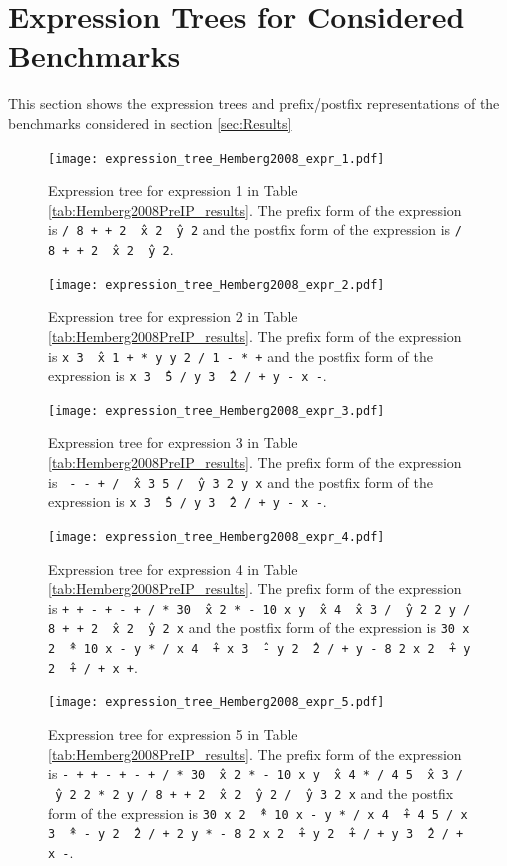 \documentclass[12pt]{iopart}
\begin{document}
\section{Expression Trees for Considered Benchmarks} %
This section shows the expression trees and prefix/postfix representations of the benchmarks considered in section \ref{sec:Results}

\begin{figure}
    \centering
    \texttt{[image: expression\_tree\_Hemberg2008\_expr\_1.pdf]}
    \caption{Expression tree for expression 1 in Table \ref{tab:Hemberg2008PreIP_results}. The prefix form of the expression is \texttt{/ 8 + + 2 \^\ x 2 \^\ y 2} and the postfix form of the expression is \texttt{/ 8 + + 2 \^\ x 2 \^\ y 2}. }
    \label{fig:expression_tree_Hemberg2008_expr_1}
\end{figure}

\begin{figure}
    \centering
    \texttt{[image: expression\_tree\_Hemberg2008\_expr\_2.pdf]}
    \caption{Expression tree for expression 2 in Table \ref{tab:Hemberg2008PreIP_results}. The prefix form of the expression is \texttt{x 3 \^\ x 1 + * y y 2 / 1 - * +} and the postfix form of the expression is \texttt{x 3 \^\ 5 / y 3 \^\ 2 / + y - x -}. } 
    \label{fig:expression_tree_Hemberg2008_expr_2}
\end{figure}

\begin{figure}
    \centering
    \texttt{[image: expression\_tree\_Hemberg2008\_expr\_3.pdf]}
    \caption{Expression tree for expression 3 in Table \ref{tab:Hemberg2008PreIP_results}. The prefix form of the expression is \texttt{ - - + / \^\ x 3 5 / \^\ y 3 2 y x} and the postfix form of the expression is \texttt{x 3 \^\ 5 / y 3 \^\ 2 / + y - x -}. } 
    \label{fig:expression_tree_Hemberg2008_expr_3}
\end{figure}

\begin{figure}
    \centering
    \texttt{[image: expression\_tree\_Hemberg2008\_expr\_4.pdf]}
    \caption{Expression tree for expression 4 in Table \ref{tab:Hemberg2008PreIP_results}.  The prefix form of the expression is \texttt{+ + - + - + / * 30 \^\ x 2 * - 10 x y \^\ x 4 \^\ x 3 / \^\ y 2 2 y / 8 + + 2 \^\ x 2 \^\ y 2 x} and the postfix form of the expression is \texttt{30 x 2 \^\ * 10 x - y * / x 4 \^\ + x 3 \^\ - y 2 \^\ 2 / + y - 8 2 x 2 \^\ + y 2 \^\ + / + x +}. } 
    \label{fig:expression_tree_Hemberg2008_expr_4}
\end{figure}

\begin{figure}
    \centering
    \texttt{[image: expression\_tree\_Hemberg2008\_expr\_5.pdf]}
    \caption{Expression tree for expression 5 in Table \ref{tab:Hemberg2008PreIP_results}. The prefix form of the expression is \texttt{- + + - + - + / * 30 \^\ x 2 * - 10 x y \^\ x 4 * / 4 5 \^\ x 3 / \^\ y 2 2 * 2 y / 8 + + 2 \^\ x 2 \^\ y 2 / \^\ y 3 2 x} and the postfix form of the expression is \texttt{30 x 2 \^\ * 10 x - y * / x 4 \^\ + 4 5 / x 3 \^\ * - y 2 \^\ 2 / + 2 y * - 8 2 x 2 \^\ + y 2 \^\ + / + y 3 \^\ 2 / + x -}. } 
    \label{fig:expression_tree_Hemberg2008_expr_5}
\end{figure}
\end{document}
